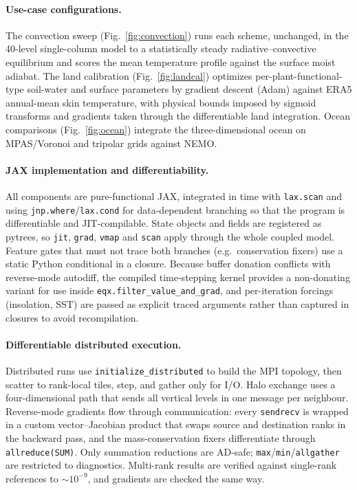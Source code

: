 \documentclass[11pt]{article}
\begin{document}
\paragraph{Use-case configurations.}
The convection sweep (Fig.~\ref{fig:convection}) runs each scheme, unchanged, in the 40-level
single-column model to a statistically steady radiative--convective equilibrium and scores the
mean temperature profile against the surface moist adiabat. The land calibration
(Fig.~\ref{fig:landcal}) optimizes per-plant-functional-type soil-water and surface parameters by
gradient descent (Adam\cite{KingmaBa2015}) against ERA5\cite{Hersbach2020} annual-mean skin
temperature, with physical bounds imposed by sigmoid transforms and gradients taken through the
differentiable land integration. Ocean comparisons (Fig.~\ref{fig:ocean}) integrate the
three-dimensional ocean on MPAS/Voronoi and tripolar grids against NEMO\cite{Madec2017}.

\paragraph{JAX implementation and differentiability.}
All components are pure-functional JAX, integrated in time with \texttt{lax.scan} and using
\texttt{jnp.where}/\texttt{lax.cond} for data-dependent branching so that the program is
differentiable and JIT-compilable. State objects and fields are registered as pytrees, so
\texttt{jit}, \texttt{grad}, \texttt{vmap} and \texttt{scan} apply through the whole coupled
model. Feature gates that must not trace both branches (e.g.\ conservation fixers) use a static
Python conditional in a closure. Because buffer donation conflicts with reverse-mode autodiff,
the compiled time-stepping kernel provides a non-donating variant for use inside
\texttt{eqx.filter\_value\_and\_grad}, and per-iteration forcings (insolation, SST) are passed
as explicit traced arguments rather than captured in closures to avoid recompilation.

\paragraph{Differentiable distributed execution.}
Distributed runs use \texttt{initialize\_distributed} to build the MPI topology, then scatter to
rank-local tiles, step, and gather only for I/O. Halo exchange uses a four-dimensional path that
sends all vertical levels in one message per neighbour. Reverse-mode gradients flow through
communication: every \texttt{sendrecv} is wrapped in a custom vector--Jacobian product that
swaps source and destination ranks in the backward pass, and the mass-conservation fixers
differentiate through \texttt{allreduce(SUM)}. Only summation reductions are AD-safe;
\texttt{max}/\texttt{min}/\texttt{allgather} are restricted to diagnostics. Multi-rank results
are verified against single-rank references to $\sim$$10^{-9}$, and gradients are checked the
same way.
\end{document}
